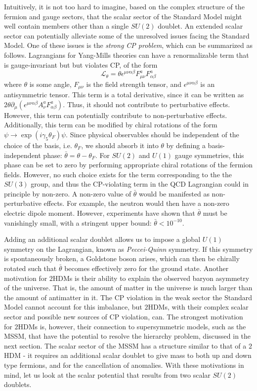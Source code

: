 Intuitively, it is not too hard to imagine, based on the complex structure of the fermion and gauge sectors, that the scalar sector of the Standard Model might well contain members other than a single $SU(2)$ doublet. An extended scalar sector can potentially alleviate some of the unresolved issues facing the Standard Model.
One of these issues is the \emph{strong CP problem}, which can be summarized as follows. Lagrangians for Yang-Mills theories can have a renormalizable term that is gauge-invariant but but violates CP, of the form
\[\mathcal{L}_{\theta} = \theta\epsilon^{\mu\nu\alpha\beta}F_{\mu\nu}^aF_{\alpha\beta}^a\]
where $\theta$ is some angle, $F_{\mu\nu}$ is the field strength tensor, and $\epsilon^{\mu\nu\alpha\beta}$ is an antisymmetric tensor. This term is a total derivative, since it can be written as $2\theta\partial_\mu(\epsilon^{\mu\nu\alpha\beta}A_\nu^aF_{\alpha\beta}^a)$. Thus, it should not contribute to perturbative effects. However, this term can potentially contribute to non-perturbative effects. Additionally, this term can be modified by chiral rotations of the form $\psi\rightarrow \exp(i\gamma_5\theta_F)\psi$. Since physical observables should be independent of the choice of the basis, i.e. $\theta_F$, we should absorb it into $\theta$ by defining a basis-independent phase: $\bar{\theta} = \theta-\theta_F$. For $SU(2)$ and $U(1)$ gauge symmetries, this phase can be set to zero by performing appropriate chiral rotations of the fermion fields. However, no such choice exists for the term corresponding to the the $SU(3)$ group, and thus the CP-violating term in the QCD Lagrangian could in principle by non-zero. A non-zero value of $\bar{\theta}$ would be manifested as non-perturbative effects. For example, the neutron would then have a non-zero electric dipole moment. However, experiments have shown that $\bar{\theta}$ must be vanishingly small, with a stringent upper bound: $\bar{\theta}<10^{-10}$.

Adding an additional scalar doublet allows us to impose a global $U(1)$ symmetry on the Lagrangian, known as \emph{Peccei-Quinn} symmetry. If this symmetry is spontaneously broken, a Goldstone boson arises, which can then be chirally rotated such that $\bar{\theta}$ becomes effectively zero for the ground state.
Another motivation for $2$HDMs is their ability to explain the observed baryon asymmetry of the universe. That is, the amount of matter in the universe is much larger than the amount of antimatter in it. The CP violation in the weak sector the Standard Model cannot account for this imbalance, but $2$HDMs, with their complex scalar sector and possible new sources of CP violation, can.
%
The strongest motivation for $2$HDMs is, however, their connection to supersymmetric models, such as the MSSM, that have the potential to resolve the hierarchy problem, discussed in the next section. The scalar sector of the MSSM has a structure similar to that of a $2$HDM - it requires an additional scalar doublet to give mass to both up and down type fermions, and for the cancellation of anomalies. With these motivations in mind, let us look at the scalar potential that results from two scalar $SU(2)$ doublets.

